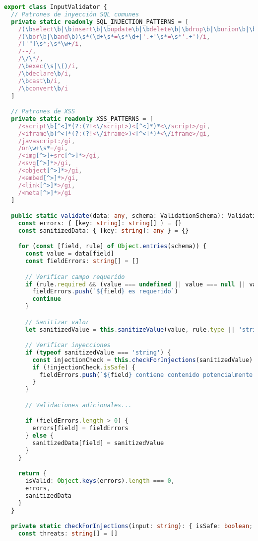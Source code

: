 \documentclass[12pt,a4paper]{article}
\begin{document}
\begin{lstlisting}[language=TypeScript, caption=Validador de Entrada]
export class InputValidator {
  // Patrones de inyección SQL comunes
  private static readonly SQL_INJECTION_PATTERNS = [
    /(\bselect\b|\binsert\b|\bupdate\b|\bdelete\b|\bdrop\b|\bunion\b|\bcreate\b|\balter\b)/i,
    /(\bor\b|\band\b)\s*(\d+\s*=\s*\d+|'.+'\s*=\s*'.+')/i,
    /['"]\s*;\s*\w+/i,
    /--/,
    /\/\*/,
    /\bexec(\s|\()/i,
    /\bdeclare\b/i,
    /\bcast\b/i,
    /\bconvert\b/i
  ]

  // Patrones de XSS
  private static readonly XSS_PATTERNS = [
    /<script\b[^<]*(?:(?!<\/script>)<[^<]*)*<\/script>/gi,
    /<iframe\b[^<]*(?:(?!<\/iframe>)<[^<]*)*<\/iframe>/gi,
    /javascript:/gi,
    /on\w+\s*=/gi,
    /<img[^>]+src[^>]*>/gi,
    /<svg[^>]*>/gi,
    /<object[^>]*>/gi,
    /<embed[^>]*>/gi,
    /<link[^>]*>/gi,
    /<meta[^>]*>/gi
  ]

  public static validate(data: any, schema: ValidationSchema): ValidationResult {
    const errors: { [key: string]: string[] } = {}
    const sanitizedData: { [key: string]: any } = {}

    for (const [field, rule] of Object.entries(schema)) {
      const value = data[field]
      const fieldErrors: string[] = []

      // Verificar campo requerido
      if (rule.required && (value === undefined || value === null || value === '')) {
        fieldErrors.push(`${field} es requerido`)
        continue
      }

      // Sanitizar valor
      let sanitizedValue = this.sanitizeValue(value, rule.type || 'string')

      // Verificar inyecciones
      if (typeof sanitizedValue === 'string') {
        const injectionCheck = this.checkForInjections(sanitizedValue)
        if (!injectionCheck.isSafe) {
          fieldErrors.push(`${field} contiene contenido potencialmente peligroso: ${injectionCheck.threats.join(', ')}`)
        }
      }

      // Validaciones adicionales...

      if (fieldErrors.length > 0) {
        errors[field] = fieldErrors
      } else {
        sanitizedData[field] = sanitizedValue
      }
    }

    return {
      isValid: Object.keys(errors).length === 0,
      errors,
      sanitizedData
    }
  }

  private static checkForInjections(input: string): { isSafe: boolean; threats: string[] } {
    const threats: string[] = []


\end{lstlisting}
\end{document}
